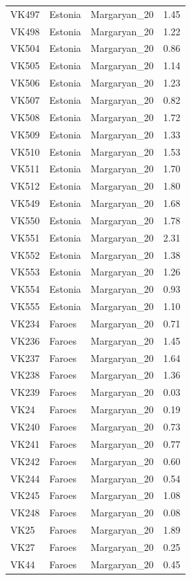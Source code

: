 \begin{longtable}[t]{lllr}
VK497 & Estonia & Margaryan\_20 & 1.45\\
VK498 & Estonia & Margaryan\_20 & 1.22\\
VK504 & Estonia & Margaryan\_20 & 0.86\\
VK505 & Estonia & Margaryan\_20 & 1.14\\
VK506 & Estonia & Margaryan\_20 & 1.23\\
VK507 & Estonia & Margaryan\_20 & 0.82\\
VK508 & Estonia & Margaryan\_20 & 1.72\\
VK509 & Estonia & Margaryan\_20 & 1.33\\
VK510 & Estonia & Margaryan\_20 & 1.53\\
VK511 & Estonia & Margaryan\_20 & 1.70\\
VK512 & Estonia & Margaryan\_20 & 1.80\\
VK549 & Estonia & Margaryan\_20 & 1.68\\
VK550 & Estonia & Margaryan\_20 & 1.78\\
VK551 & Estonia & Margaryan\_20 & 2.31\\
VK552 & Estonia & Margaryan\_20 & 1.38\\
VK553 & Estonia & Margaryan\_20 & 1.26\\
VK554 & Estonia & Margaryan\_20 & 0.93\\
VK555 & Estonia & Margaryan\_20 & 1.10\\
VK234 & Faroes & Margaryan\_20 & 0.71\\
VK236 & Faroes & Margaryan\_20 & 1.45\\
VK237 & Faroes & Margaryan\_20 & 1.64\\
VK238 & Faroes & Margaryan\_20 & 1.36\\
VK239 & Faroes & Margaryan\_20 & 0.03\\
VK24 & Faroes & Margaryan\_20 & 0.19\\
VK240 & Faroes & Margaryan\_20 & 0.73\\
VK241 & Faroes & Margaryan\_20 & 0.77\\
VK242 & Faroes & Margaryan\_20 & 0.60\\
VK244 & Faroes & Margaryan\_20 & 0.54\\
VK245 & Faroes & Margaryan\_20 & 1.08\\
VK248 & Faroes & Margaryan\_20 & 0.08\\
VK25 & Faroes & Margaryan\_20 & 1.89\\
VK27 & Faroes & Margaryan\_20 & 0.25\\
VK44 & Faroes & Margaryan\_20 & 0.45\\

\end{longtable}
